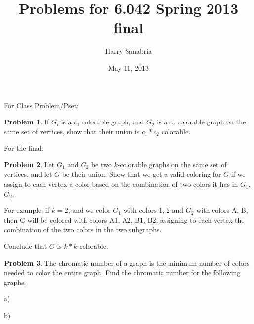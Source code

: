 \documentclass{amsart}
\title{Problems for 6.042 Spring 2013 final}
\author{Harry Sanabria}
\date{May 11, 2013}
\theoremstyle{definition}
\newtheorem{problem}{Problem}
\theoremstyle{remark}
\begin{document}
\maketitle

For Class Problem/Pset:
\begin{problem}
If $G_i$ is a $c_1$ colorable graph, and $G_2$ is a $c_2$ colorable graph on the same set of vertices, show that their union is $c_1*c_2$ colorable.
\end{problem}
\setcounter{problem}{0}

For the final:
\begin{problem}
Let $G_1$ and $G_2$ be two $k$-colorable graphs on the same set of vertices, and let $G$ be their union.  Show that we get a valid coloring for $G$ if we assign to each vertex a color based on the combination of two colors it has in $G_1$, $G_2$.  

For example, if $k=2$, and we color $G_1$ with colors 1, 2 and $G_2$ with colors A, B, then G will be colored with colors A1, A2, B1, B2, assigning to each vertex the combination of the two colors in the two subgraphs.

Conclude that $G$ is $k*k$-colorable.
\end{problem}

\begin{problem}
The chromatic number of a graph is the minimum number of colors needed to color the entire graph.  Find the chromatic number for the following graphs:
\end{problem}
a)
b)
\end{document}
